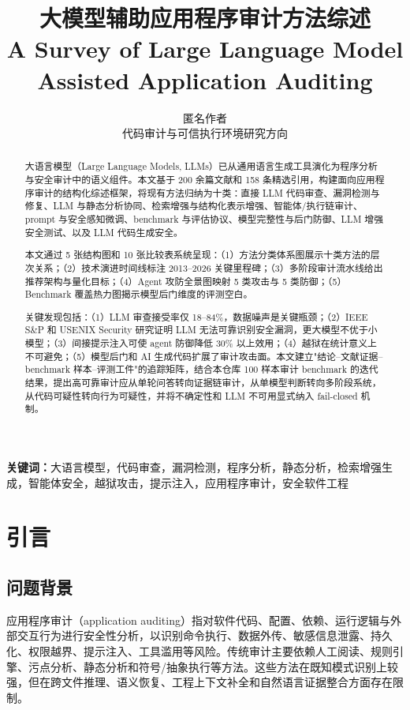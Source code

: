 \documentclass[11pt,a4paper,onecolumn]{article}
\title{\textbf{大模型辅助应用程序审计方法综述}\\[0.3em]
\large A Survey of Large Language Model Assisted Application Auditing}
\author{匿名作者\\
\small 代码审计与可信执行环境研究方向}
\date{}
\begin{document}
\maketitle

\begin{abstract}
大语言模型（Large Language Models, LLMs）已从通用语言生成工具演化为程序分析与安全审计中的语义组件。本文基于 200 余篇文献和 158 条精选引用，构建面向应用程序审计的结构化综述框架，将现有方法归纳为十类：直接 LLM 代码审查、漏洞检测与修复、LLM 与静态分析协同、检索增强与结构化表示增强、智能体/执行链审计、prompt 与安全感知微调、benchmark 与评估协议、模型完整性与后门防御、LLM 增强安全测试、以及 LLM 代码生成安全。

本文通过 5 张结构图和 10 张比较表系统呈现：（1）方法分类体系图展示十类方法的层次关系；（2）技术演进时间线标注 2013--2026 关键里程碑；（3）多阶段审计流水线给出推荐架构与量化目标；（4）Agent 攻防全景图映射 5 类攻击与 5 类防御；（5）Benchmark 覆盖热力图揭示模型后门维度的评测空白。

关键发现包括：（1）LLM 审查接受率仅 18--84\%，数据噪声是关键瓶颈；（2）IEEE S\&P 和 USENIX Security 研究证明 LLM 无法可靠识别安全漏洞，更大模型不优于小模型；（3）间接提示注入可使 agent 防御降低 30\% 以上效用；（4）越狱在统计意义上不可避免；（5）模型后门和 AI 生成代码扩展了审计攻击面。本文建立"结论--文献证据--benchmark 样本--评测工件"的追踪矩阵，结合本仓库 100 样本审计 benchmark 的迭代结果，提出高可靠审计应从单轮问答转向证据链审计，从单模型判断转向多阶段系统，从代码可疑性转向行为可疑性，并将不确定性和 LLM 不可用显式纳入 fail-closed 机制。
\end{abstract}

\noindent\textbf{关键词：}大语言模型，代码审查，漏洞检测，程序分析，静态分析，检索增强生成，智能体安全，越狱攻击，提示注入，应用程序审计，安全软件工程
\vspace{0.5em}

\section{引言}

\subsection{问题背景}
应用程序审计（application auditing）指对软件代码、配置、依赖、运行逻辑与外部交互行为进行安全性分析，以识别命令执行、数据外传、敏感信息泄露、持久化、权限越界、提示注入、工具滥用等风险。传统审计主要依赖人工阅读、规则引擎、污点分析、静态分析和符号/抽象执行等方法。这些方法在既知模式识别上较强，但在跨文件推理、语义恢复、工程上下文补全和自然语言证据整合方面存在限制。
\end{document}
